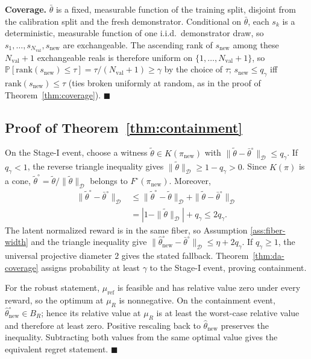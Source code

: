 \documentclass{article}
\newcommand{\Dnorm}[1]{\|#1\|_{\mathcal D}}
\begin{document}
\textbf{Coverage.} $\bar\theta$ is a fixed, measurable function of the
training split, disjoint from the calibration split and the fresh
demonstrator. Conditional on $\bar\theta$, each $s_k$ is a deterministic,
measurable function of one i.i.d.\ demonstrator draw, so
$s_1,\dots,s_{N_{\mathrm{val}}},s_{\mathrm{new}}$ are exchangeable. The
ascending rank of $s_{\mathrm{new}}$ among these $N_{\mathrm{val}}+1$
exchangeable reals is therefore uniform on $\{1,\dots,N_{\mathrm{val}}+1\}$,
so $\mathbb P[\mathrm{rank}(s_{\mathrm{new}})\le\tau] =
\tau/(N_{\mathrm{val}}+1)\ge\gamma$ by the choice of $\tau$; $s_{\mathrm{new}}
\le q_\gamma$ iff $\mathrm{rank}(s_{\mathrm{new}})\le\tau$ (ties broken
uniformly at random, as in the proof of Theorem~\ref{thm:coverage}).
$\blacksquare$

\subsection{Proof of Theorem~\ref{thm:containment}}
\label{app:proof-containment}

On the Stage-I event, choose a witness
$\tilde\theta\in K(\pi_{\mathrm{new}})$ with
$\Dnorm{\tilde\theta-\bar\theta^\circ}\le q_\gamma$. If $q_\gamma<1$, the
reverse triangle inequality gives
$\Dnorm{\tilde\theta}\ge1-q_\gamma>0$. Since $K(\pi)$ is a cone,
$\tilde\theta^\circ=\tilde\theta/\Dnorm{\tilde\theta}$ belongs to
$F^\circ(\pi_{\mathrm{new}})$. Moreover,
\begin{align*}
\Dnorm{\tilde\theta^\circ-\bar\theta^\circ}
&\le \Dnorm{\tilde\theta^\circ-\tilde\theta}
   +\Dnorm{\tilde\theta-\bar\theta^\circ}\\
&=|1-\Dnorm{\tilde\theta}|+q_\gamma\le2q_\gamma.
\end{align*}
The latent normalized reward is in the same fiber, so Assumption
\ref{ass:fiber-width} and the triangle inequality give
$\Dnorm{\hat\theta_{\mathrm{new}}^\circ-\bar\theta^\circ}
\le\eta+2q_\gamma$. If $q_\gamma\ge1$, the universal projective diameter $2$
gives the stated fallback. Theorem~\ref{thm:da-coverage} assigns probability at
least $\gamma$ to the Stage-I event, proving containment.

For the robust statement, $\mu_{\mathrm{ref}}$ is feasible and has relative
value zero under every reward, so the optimum at $\mu_R$ is nonnegative. On the
containment event, $\hat\theta_{\mathrm{new}}^\circ\in B_R$; hence its relative
value at $\mu_R$ is at least the worst-case relative value and therefore at
least zero. Positive rescaling back to $\hat\theta_{\mathrm{new}}$ preserves
the inequality. Subtracting both values from the same optimal value gives the
equivalent regret statement. $\blacksquare$
\end{document}
